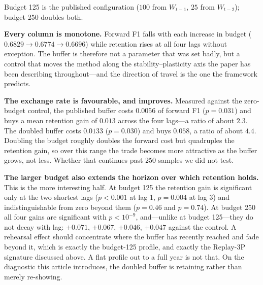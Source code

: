 \documentclass[a4paper,twoside]{article}
\begin{document}
\begin{table}[t]
  \centering
  \caption{Replay budget against forward accuracy and backward retention on Qwen2.5-Coder-1.5B. Budget counts rehearsal samples drawn from $W_{t-1}$ and $W_{t-2}$; the zero-budget row is window-only, which holds no buffer. All other settings are identical.}
  \label{tab:buffer}
  \vspace{1mm}
  {\footnotesize Budget 125 is the published configuration ($100$ from $W_{t-1}$, $25$ from $W_{t-2}$); budget 250 doubles both.}
\end{table}

\textbf{Every column is monotone.} Forward F1 falls with each increase in budget ($0.6829 \rightarrow 0.6774 \rightarrow 0.6696$) while retention rises at all four lags without exception. The buffer is therefore not a parameter that was set badly, but a control that moves the method along the stability--plasticity axis the paper has been describing throughout---and the direction of travel is the one the framework predicts.

\textbf{The exchange rate is favourable, and improves.} Measured against the zero-budget control, the published buffer costs $0.0056$ of forward F1 ($p=0.031$) and buys a mean retention gain of $0.013$ across the four lags---a ratio of about $2.3$. The doubled buffer costs $0.0133$ ($p=0.030$) and buys $0.058$, a ratio of about $4.4$. Doubling the budget roughly doubles the forward cost but quadruples the retention gain, so over this range the trade becomes more attractive as the buffer grows, not less. Whether that continues past 250 samples we did not test.

\textbf{The larger budget also extends the horizon over which retention holds.} This is the more interesting half. At budget 125 the retention gain is significant only at the two shortest lags ($p<0.001$ at lag 1, $p=0.004$ at lag 3) and indistinguishable from zero beyond them ($p=0.46$ and $p=0.74$). At budget 250 all four gains are significant with $p<10^{-9}$, and---unlike at budget 125---they do not decay with lag: $+0.071$, $+0.067$, $+0.046$, $+0.047$ against the control. A rehearsal effect should concentrate where the buffer has recently reached and fade beyond it, which is exactly the budget-125 profile, and exactly the Replay-3P signature discussed above. A flat profile out to a full year is not that. On the diagnostic this article introduces, the doubled buffer is retaining rather than merely re-showing.
\end{document}
